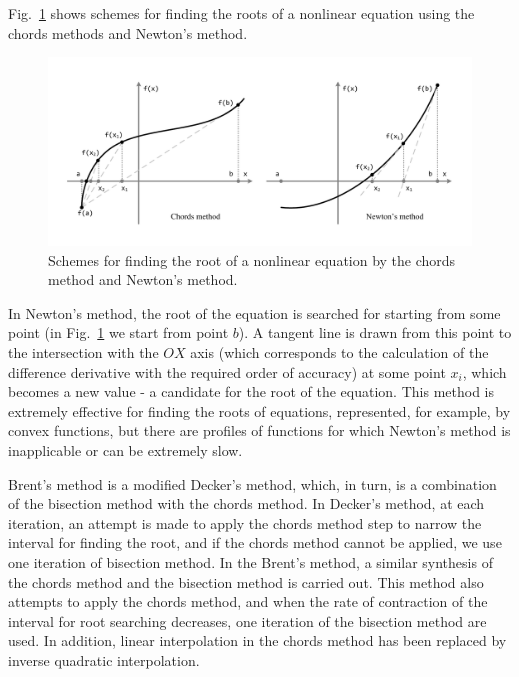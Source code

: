 \documentclass[
11pt,%
tightenlines,%
twoside,%
onecolumn,%
nofloats,%
nobibnotes,%
nofootinbib,%
superscriptaddress,%
noshowpacs,%
centertags]%
{revtex4}
\begin{document}
Fig.~\ref{fig:chords-newton} shows schemes for finding the roots of a nonlinear equation using the chords methods and Newton's method.

\begin{figure}[h]
\setcaptionmargin{5mm}
\onelinecaptionstrue
\includegraphics[width=1.0\textwidth]{pics/chords-newton.pdf}
\caption{Schemes for finding the root of a nonlinear equation by the chords method and Newton's method.}\label{fig:chords-newton}
\end{figure}

In Newton's method, the root of the equation is searched for starting from some point (in Fig.~\ref{fig:chords-newton} we start from point $b$).
A tangent line is drawn from this point to the intersection with the $OX$ axis (which corresponds to the calculation of the difference derivative with the required order of accuracy) at some point $x_i$, which becomes a new value - a candidate for the root of the equation.
This method is extremely effective for finding the roots of equations, represented, for example, by convex functions, but there are profiles of functions for which Newton's method is inapplicable or can be extremely slow.

Brent's method is a modified Decker's method, which, in turn, is a combination of the bisection method with the chords method.
In Decker's method, at each iteration, an attempt is made to apply the chords method step to narrow the interval for finding the root, and if the chords method cannot be applied, we use one iteration of bisection method.
In the Brent's method, a similar synthesis of the chords method and the bisection method is carried out.
This method also attempts to apply the chords method, and when the rate of contraction of the interval for root searching decreases, one iteration of the bisection method are used.
In addition, linear interpolation in the chords method has been replaced by inverse quadratic interpolation.
\end{document}
